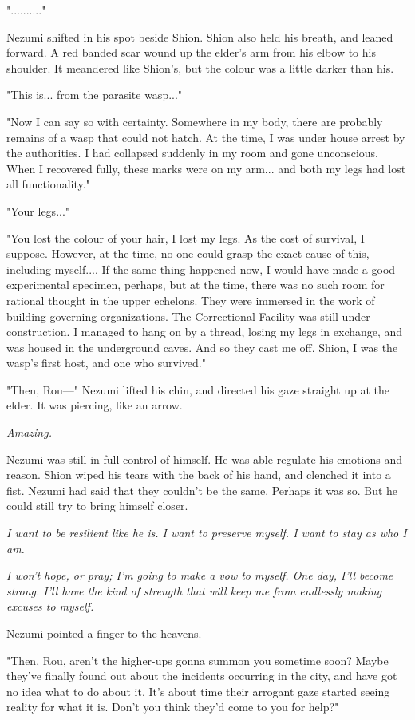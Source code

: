 ".........."

Nezumi shifted in his spot beside Shion. Shion also held his breath, and
leaned forward. A red banded scar wound up the elder's arm from his
elbow to his shoulder. It meandered like Shion's, but the colour was a
little darker than his.

"This is... from the parasite wasp..."

"Now I can say so with certainty. Somewhere in my body, there are
probably remains of a wasp that could not hatch. At the time, I was
under house arrest by the authorities. I had collapsed suddenly in my
room and gone unconscious. When I recovered fully, these marks were on
my arm... and both my legs had lost all functionality."

"Your legs..."

"You lost the colour of your hair, I lost my legs. As the cost of
survival, I suppose. However, at the time, no one could grasp the exact
cause of this, including myself.... If the same thing happened now, I
would have made a good experimental specimen, perhaps, but at the time,
there was no such room for rational thought in the upper echelons. They
were immersed in the work of building governing organizations. The
Correctional Facility was still under construction. I managed to hang on
by a thread, losing my legs in exchange, and was housed in the
underground caves. And so they cast me off. Shion, I was the wasp's
first host, and one who survived."

"Then, Rou---" Nezumi lifted his chin, and directed his gaze straight up
at the elder. It was piercing, like an arrow.

\emph{Amazing.}

Nezumi was still in full control of himself. He was able regulate his
emotions and reason. Shion wiped his tears with the back of his hand,
and clenched it into a fist. Nezumi had said that they couldn't be the
same. Perhaps it was so. But he could still try to bring himself closer.

\emph{I want to be resilient like he is. I want to preserve myself. I want to
stay as who I am.}

\emph{I won't hope, or pray; I'm going to make a vow to myself. One day, I'll
become strong. I'll have the kind of strength that will keep me from
endlessly making excuses to myself.}

Nezumi pointed a finger to the heavens.

"Then, Rou, aren't the higher-ups gonna summon you sometime soon? Maybe
they've finally found out about the incidents occurring in the city, and
have got no idea what to do about it. It's about time their arrogant
gaze started seeing reality for what it is. Don't you think they'd come
to you for help?"

